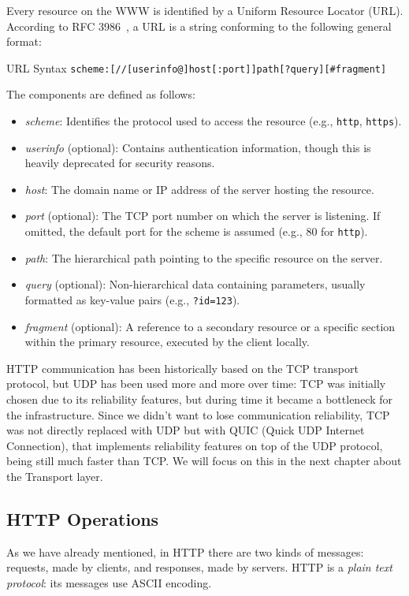 Every resource on the WWW is identified by a Uniform Resource Locator (URL). According to RFC 3986~\cite{rfc3986}, a URL is a string conforming to the following general format:

\begin{example}{URL Syntax}
\texttt{scheme:[//[userinfo@]host[:port]]path[?query][\#fragment]}
\end{example}

The components are defined as follows:
\begin{itemize}
    \item \emph{scheme}: Identifies the protocol used to access the resource (e.g., \texttt{http}, \texttt{https}).
    \item \emph{userinfo} (optional): Contains authentication information, though this is heavily deprecated for security reasons.
    \item \emph{host}: The domain name or IP address of the server hosting the resource.
    \item \emph{port} (optional): The TCP port number on which the server is listening. If omitted, the default port for the scheme is assumed (e.g., 80 for \texttt{http}).
    \item \emph{path}: The hierarchical path pointing to the specific resource on the server.
    \item \emph{query} (optional): Non-hierarchical data containing parameters, usually formatted as key-value pairs (e.g., \texttt{?id=123}).
    \item \emph{fragment} (optional): A reference to a secondary resource or a specific section within the primary resource, executed by the client locally.
\end{itemize}

HTTP communication has been historically based on the TCP transport protocol, but UDP has been used more and more over time: TCP was initially chosen due to its reliability features, but during time it became a bottleneck for the infrastructure.
Since we didn't want to lose communication reliability, TCP was not directly replaced with UDP but with QUIC (Quick UDP Internet Connection), that implements reliability features on top of the UDP protocol, being still much faster than TCP.
We will focus on this in the next chapter about the Transport layer.

\subsection{HTTP Operations}
As we have already mentioned, in HTTP there are two kinds of messages: requests, made by clients, and responses, made by servers.
HTTP is a \emph{plain text protocol}: its messages use ASCII encoding.

